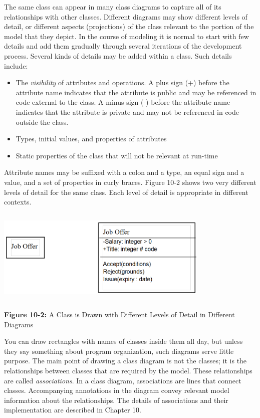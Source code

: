 The same class can appear in many class diagrams to capture all of its
relationships with other classes. Different diagrams may show different
levels of detail, or different aspects (projections) of the class
relevant to the portion of the model that they depict. In the course of
modeling it is normal to start with few details and add them gradually
through several iterations of the development process. Several kinds of
details may be added within a class. Such details include:

\begin{itemize}
\item The \textit{visibility} of
attributes and operations. A plus sign (+) before the attribute name
indicates that the attribute is public and may be
referenced in code external to the class. A minus sign
(-) before the attribute name indicates that the attribute is
private and may not be referenced in code outside the
class.
\item Types, initial values, and properties of attributes
\item Static properties of the class that will not be relevant at
run-time
\end{itemize}
Attribute names may be suffixed with a colon and a type, an equal sign
and a value, and a set of properties in curly braces. Figure 10-2 shows
two very different levels of detail for the same class. Each level of
detail is appropriate in different contexts.

\bigskip

\includegraphics[width=4in,height=1.8in]{ub-img/lodetail.png} 

{\sffamily\bfseries Figure 10-2:}
{\sffamily A Class is Drawn with Different Levels of Detail in
 Different Diagrams}

\bigskip

You can draw rectangles with names of classes inside them all day, but
unless they say something about program organization, such diagrams
serve little purpose. The main point of drawing a class diagram is not
the classes; it is the relationships between classes that are required
by the model. These relationships are called
\textit{associations}. In a class diagram,
associations are lines that connect classes. Accompanying annotations
in the diagram convey relevant model information about the
relationships. The details of associations and their implementation are
described in Chapter 10.

